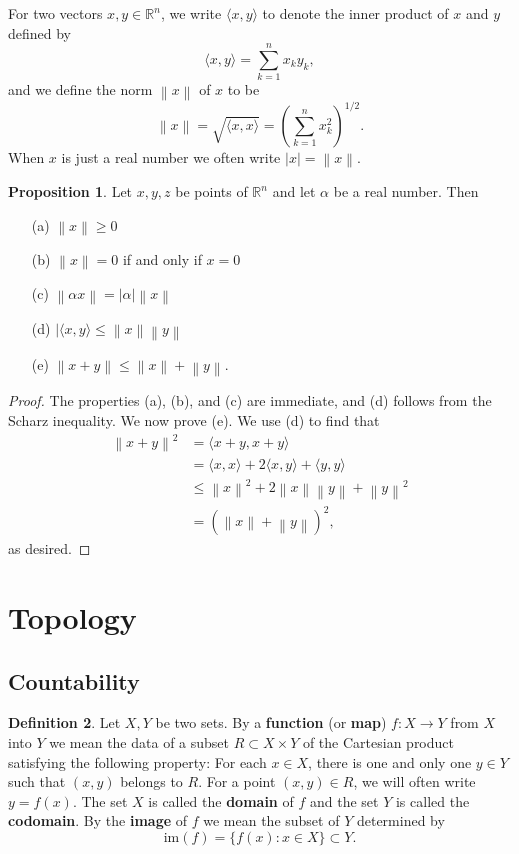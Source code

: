 \documentclass[12pt]{article}
\newcommand{\norm}[1]{\left\lVert#1\right\rVert}
\theoremstyle{definition}
\newtheorem{definition}{Definition}
\theoremstyle{theorem}
\newtheorem{proposition}[definition]{Proposition}
\begin{document}
For two vectors $x,y \in \mathbb{R}^n$, we write $\langle x, y \rangle$ to denote the inner product of $x$ and $y$ defined by 
\[
\langle x, y \rangle = \sum_{k=1}^n x_k y_k,
\]
and we define the norm $\norm{x}$ of $x$ to be 
\[
\norm{x} = \sqrt{\langle x, x \rangle} = \left(\sum_{k=1}^n x_k^2\right)^{1/2}.
\]
When $x$ is just a real number we often write $|x| = \norm{x}$. 

\begin{proposition}
Let $x,y,z$ be points of $\mathbb{R}^n$ and let $\alpha$ be a real number. Then
\begin{enumerate}
\item[(a)] $\norm{x} \geqslant 0$
\item[(b)] $\norm{x} = 0$ if and only if $x = 0$
\item[(c)] $\norm{\alpha x} = |\alpha|\norm{x}$
\item[(d)] $|\langle x, y \rangle \leqslant \norm{x}\norm{y}$ 
\item[(e)] $\norm{x + y} \leqslant \norm{x} + \norm{y}$.
\end{enumerate}
\end{proposition}

\begin{proof}
The properties (a), (b), and (c) are immediate, and (d) follows from the Scharz inequality. We now prove (e). We use (d) to find that  
\begin{align*}
\norm{x + y}^2 &= \langle x + y, x + y \rangle \\ 
&= \langle x, x \rangle + 2 \langle x, y \rangle + \langle y, y \rangle \\
&\leqslant \norm{x}^2 + 2 \norm{x}\norm{y} + \norm{y}^2 \\
&= (\norm{x} + \norm{y})^2,
\end{align*}
as desired. 
\end{proof}


\section{Topology}

\subsection{Countability}

\begin{definition}
Let $X,Y$ be two sets. By a \textbf{function} (or \textbf{map}) $f : X \to Y$ from $X$ into $Y$ we mean the data of a subset $R \subset X \times Y$ of the Cartesian product satisfying the following property: For each $x \in X$, there is one and only one $y \in Y$ such that $(x,y)$ belongs to $R$. For a point $(x,y) \in R$, we will often write $y = f(x)$. The set $X$ is called the \textbf{domain} of $f$ and the set $Y$ is called the \textbf{codomain}. By the \textbf{image} of $f$ we mean the subset of $Y$ determined by 
\[
\text{im}(f) = \{f(x) : x \in X \} \subset Y.
\] 
\end{definition} 
\end{document}
